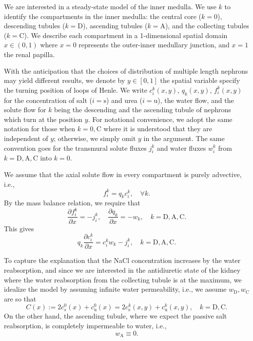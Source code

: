 \documentclass{article}
\begin{document}
We are interested in a steady-state model of the inner medulla.
We use $k$ to identify the compartments in the inner medulla: the central core ($k=0$), descending tubules ($k=\mathrm{D}$), ascending tubules ($k=\mathrm{A}$), and the collecting tubules ($k=\mathrm{C}$).
We describe each compartment in a 1-dimensional spatial domain $x\in (0,1)$ where $x=0$ represents the outer-inner medullary junction, and $x=1$ the renal papilla.

With the anticipation that the choices of distribution of multiple length nephrons may yield different results, we denote by $y\in[0,1]$ the spatial variable specify the turning position of loops of Henle.
We write $c_i^k(x,y)$, $q_k(x,y)$, $f_i^k(x,y)$ for the concentration of salt ($i=\mathrm{s}$) and urea ($i=\mathrm{u}$), the water flow, and the solute flow for $k$ being the descending and the ascending tubule of nephrons which turn at the position $y$.
For notational convenience, we adopt the same notation for those when $k=0,\mathrm{C}$ where it is understood that they are independent of $y$; otherwise, we simply omit $y$ in the argument.
The same convention goes for the transmural solute fluxes $j_i^k$ and water fluxes $w_i^k$ from $k=\mathrm{D,A,C}$ into $k=0$.

We assume that the axial solute flow in every compartment is purely advective, i.e.,
\begin{equation}
    f_i^k = q_kc_i^k,\quad \forall k.
\end{equation}
By the mass balance relation, we require that
\begin{equation}
    \frac{\partial f_i^k}{\partial x} = -j_i^k,\quad \frac{\partial q_k}{\partial x} = -w_k,\quad k=\mathrm{D,A,C}.
\end{equation}
This gives
\begin{equation}\label{eq:tubule_mass_balance}
    q_k\frac{\partial c_i^k}{\partial x} = c_i^kw_k - j_i^k,\quad k=\mathrm{D,A,C}.
\end{equation}

To capture the explanation that the NaCl concentration increases by the water reabsorption, and since we are interested in the antidiuretic state of the kidney where the water reabsorption from the collecting tubule is at the maximum, we idealize the model by assuming infinite water permeability, i.e., we assume $w_\mathrm{D}, w_\mathrm{C}$ are so that
\begin{equation}
    C(x):=2c_s^0(x)+ c_\mathrm{u}^0(x) = 2c_\mathrm{s}^k(x,y)+c_\mathrm{u}^k(x,y),\quad k=\mathrm{D},\mathrm{C}.
\end{equation}
On the other hand, the ascending tubule, where we expect the passive salt reabsorption, is completely impermeable to water, i.e.,
\begin{equation}
    w_\mathrm{A}\equiv 0.
\end{equation}
\end{document}
